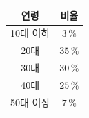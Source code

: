 {\setlength{\tabcolsep}{5pt}\renewcommand{\arraystretch}{1.3}%
\begin{tabular}{|c|c|}
\hline
\textbf{연령} & \textbf{비율} \\
\hline
10대 이하 & $3\,\%$ \\
\hline
20대 & $35\,\%$ \\
\hline
30대 & $30\,\%$ \\
\hline
40대 & $25\,\%$ \\
\hline
50대 이상 & $7\,\%$ \\
\hline
\end{tabular}}
